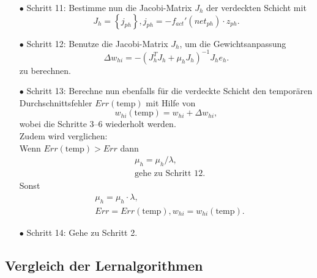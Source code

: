 \begin{itemize}
\item[\textbf{$\bullet$}] Schritt 11: Bestimme nun die Jacobi-Matrix $J_{h}$ der verdeckten Schicht mit
\begin{equation}
J_{h}= \left \{ j_{ph} \right \}, j_{ph}=-f_{act}'(net_{ph}) \cdot z_{ph}.
\end{equation}

\item[\textbf{$\bullet$}] Schritt 12: Benutze die Jacobi-Matrix $J_{h}$, um die Gewichtsanpassung 
\begin{equation}
\Delta w_{hi}=-(J_{h}^T J_{h} + \mu_{h} J_{h})^{-1} J_{h} e_{h}.
\end{equation}
zu berechnen.

\item[\textbf{$\bullet$}] Schritt 13: Berechne nun ebenfalls für die verdeckte Schicht den temporären Durchschnittsfehler $Err(\text{temp})$ mit Hilfe von
\begin{equation}
w_{hi}(\text{temp})= w_{hi} + \Delta w_{hi},
\end{equation}
wobei die Schritte 3--6 wiederholt werden.\\
Zudem wird verglichen:\\
Wenn $Err(\text{temp}) > Err$ dann
\begin{align*}
&\mu_h = \mu_h / \lambda, \\
&\text{gehe zu Schritt 12.}
\end{align*}
Sonst
\begin{align*}
&\mu_h = \mu_h \cdot \lambda, \\
&Err=Err(\text{temp}), w_{hi}=w_{hi}(\text{temp}).
\end{align*}

\item[\textbf{$\bullet$}] Schritt 14: Gehe zu Schritt 2.
\end{itemize}

\subsection{Vergleich der Lernalgorithmen}\label{sec:vergleich_la}

